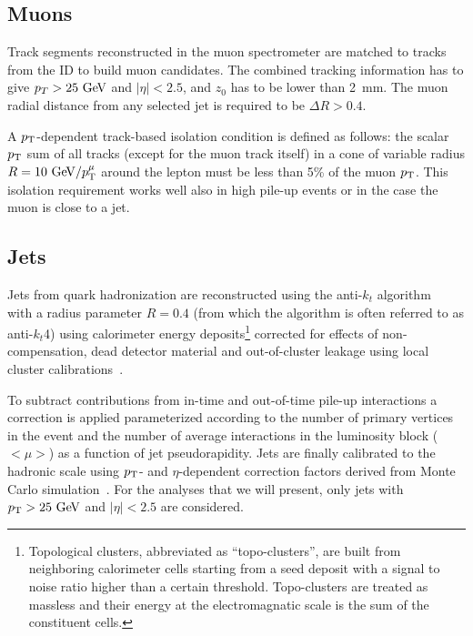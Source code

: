 \subsection{Muons}\label{sec:muons}
Track segments reconstructed in the muon spectrometer are matched to tracks from the ID to build
muon candidates. The combined tracking information has to give $p_T>25\gev$ and $|\eta|<2.5$, and
$z_{0}$ has to be lower than 2~mm.
The muon radial distance from any selected jet is required to be $\Delta R > 0.4$.

A  $\pt$-dependent track-based isolation condition is defined as follows:
the scalar $\pt$ sum of all tracks (except for the muon track itself) 
in a cone of variable radius $R=10\gev/\pt^\mu$ around the lepton
must be less than 5\% of the muon $\pt$.
This isolation requirement works well also in high pile-up events
or in the case the muon is close to a jet.

\subsection{Jets}\label{sec:jets}

Jets from quark hadronization are reconstructed using the anti-$k_t$
algorithm~\cite{ref:Cacciari2008,ref:Cacciari2006,ref:fastjet} with a
radius parameter $R=0.4$ (from which the algorithm is often referred to as anti-$k_t$4) 
using calorimeter energy deposits\footnote{Topological clusters, abbreviated as ``topo-clusters'', are 
built from neighboring calorimeter cells starting from a seed deposit with a signal to noise ratio
higher than a certain threshold. Topo-clusters are treated as massless and their energy at the electromagnatic 
scale is the sum of the constituent cells.}
corrected for effects of non-compensation,
dead detector material and out-of-cluster leakage using local cluster calibrations~\cite{LCW1,LCW2}.

To subtract contributions from in-time and out-of-time pile-up interactions a correction is applied
parameterized according to the number of primary vertices in the event and the number of average interactions 
in the luminosity block ($<\mu>$) as a function of jet pseudorapidity.
Jets are finally calibrated to the hadronic scale using $\pt$- and $\eta$-dependent correction factors 
derived from Monte Carlo simulation~\cite{jes}.
For the analyses that we will present, only jets with $\pt > 25\gev$ and $|\eta| < 2.5$ are considered.

